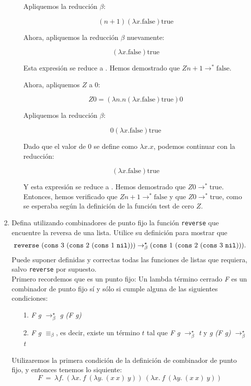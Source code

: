 \documentclass{article}
\begin{document}
\begin{enumerate}
\begin{enumerate}
            Apliquemos la reducción $\beta$:

            \[ (n + 1) (\lambda x. \text{false}) \text{true} \]

            Ahora, apliquemos la reducción $\beta$ nuevamente:

            \[ (\lambda x. \text{false}) \text{true} \]

            Esta expresión se reduce a . Hemos demostrado que $Z n + 1 \rightarrow^\ast \text{false}$.

            Ahora, apliquemos $Z$ a 0:

            \[ Z 0 = (\lambda n. n (\lambda x. \text{false}) \text{true}) 0 \]

            Apliquemos la reducción $\beta$:

            \[ 0 (\lambda x. \text{false}) \text{true} \]

            Dado que el valor de 0 se define como $\lambda x.x$, podemos continuar con la reducción:

            \[ (\lambda x. \text{false}) \text{true} \]

            Y esta expresión se reduce a . Hemos demostrado que $Z 0 \rightarrow^\ast \text{true}$.\\

            Entonces, hemos verificado que $Z n + 1 \rightarrow^\ast \text{false}$ y que $Z 0 \rightarrow^\ast \text{true}$, como se esperaba según la definición de la función test de cero $Z$.

        \end{enumerate}

        \item Defina utilizando combinadores de punto fijo la función {\tt reverse} que encuentre la reversa de una lista. Utilice su definición para mostrar que $${\tt reverse}\,\, ({\tt cons}\,\, 3\,\, ({\tt cons}\,\, 2\,\, ({\tt cons}\,\, 1\,\, {\tt nil}))) \to^\star_\beta ({\tt cons}\,\, 1\,\, ({\tt cons}\,\, 2\,\, ({\tt cons}\,\, 3\,\, {\tt nil}))).$$ Puede suponer definidas y correctas todas las funciones de listas que requiera, salvo {\tt reverse} por supuesto.\\

        Primero recordemos que es un punto fijo: Un lambda término cerrado \textit{F} es un combinador de punto fijo sí y sólo si cumple alguna de las siguientes condiciones:

        \begin{enumerate}
            \item[1.] \textit{F g $\to^\star_\beta$ g (F g)}
            \item[2.] \textit{F g $\equiv_\beta$}, es decir, existe un término $t$ tal que \textit{F g $\to^\star_\beta$ t} y \textit{g (F g) $\to^\star_\beta$ t} 
        \end{enumerate}
         Utilizaremos la primera condición de la definición de combinador de punto fijo, y entonces tenemos lo siquiente:\\
         $$
            F\:=\:\lambda f.\:(\lambda x.\:f\:(\lambda y.\:(x\:x)\:y))\:(\lambda x.\:f\:(\lambda y.\:(x\:x)\:y))
         $$         


\end{enumerate}
\end{document}
